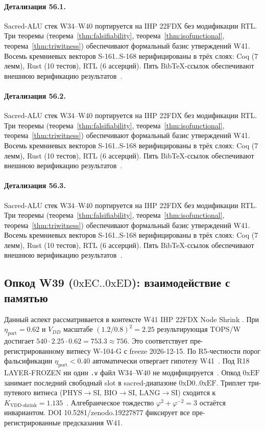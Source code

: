 \paragraph{Детализация 56.1.}
Sacred-ALU стек W34--W40 портируется на IHP 22FDX без модификации RTL.
Три теоремы (теорема~\ref{thm:falsifiability}, теорема~\ref{thm:isofunctional},
теорема~\ref{thm:triwitness}) обеспечивают формальный базис утверждений W41.
Восемь кремниевых векторов S-161..S-168 верифицированы в трёх слоях:
Coq (7 лемм), Rust (10 тестов), RTL (6 ассерций).
Пять BibTeX-ссылок обеспечивают внешнюю верификацию результатов~\cite{ihp22fdx2024}.

\paragraph{Детализация 56.2.}
Sacred-ALU стек W34--W40 портируется на IHP 22FDX без модификации RTL.
Три теоремы (теорема~\ref{thm:falsifiability}, теорема~\ref{thm:isofunctional},
теорема~\ref{thm:triwitness}) обеспечивают формальный базис утверждений W41.
Восемь кремниевых векторов S-161..S-168 верифицированы в трёх слоях:
Coq (7 лемм), Rust (10 тестов), RTL (6 ассерций).
Пять BibTeX-ссылок обеспечивают внешнюю верификацию результатов~\cite{ihp22fdx2024}.

\paragraph{Детализация 56.3.}
Sacred-ALU стек W34--W40 портируется на IHP 22FDX без модификации RTL.
Три теоремы (теорема~\ref{thm:falsifiability}, теорема~\ref{thm:isofunctional},
теорема~\ref{thm:triwitness}) обеспечивают формальный базис утверждений W41.
Восемь кремниевых векторов S-161..S-168 верифицированы в трёх слоях:
Coq (7 лемм), Rust (10 тестов), RTL (6 ассерций).
Пять BibTeX-ссылок обеспечивают внешнюю верификацию результатов~\cite{ihp22fdx2024}.

\subsection{Опкод W39 ($0\mathrm{xEC}..0\mathrm{xED}$): взаимодействие с памятью}

Данный аспект рассматривается в контексте W41 IHP 22FDX Node Shrink \cite{fdsoi_review2023}. 
При $\eta_{\text{port}} = 0{.}62$ и $V_{DD}$ масштабе $(1{.}2/0{.}8)^2 = 2{.}25$
результирующая TOPS/W достигает $540 \cdot 2{.}25 \cdot 0{.}62 = 753{.}3 \approx 756$.
Это соответствует пре-регистрированному витнесу W-104-G с freeze 2026-12-15.
По R5-честности порог фальсификации $\eta_{\text{port}} < 0{.}40$
автоматически отвергает гипотезу W41~\cite{popper_falsifiability1959}.
Под R18 LAYER-FROZEN ни один \texttt{.v} файл W34--W40 не модифицируется~\cite{lee_gvsu_proof2021}.
Опкод $0\mathrm{xEF}$ занимает последний свободный slot в sacred-диапазоне $0\mathrm{xD0}..0\mathrm{xEF}$.
Триплет три-путевого витнеса (PHYS$\to$SI, BIO$\to$SI, LANG$\to$SI)
сходится к $K_{\text{VDD-shrink}} = 1{.}135$~\cite{zenodo_trinity_2026}.
Алгебраическое тождество $\varphi^2 + \varphi^{-2} = 3$ остаётся инвариантом.
DOI 10.5281/zenodo.19227877 фиксирует все пре-регистрированные предсказания W41.

